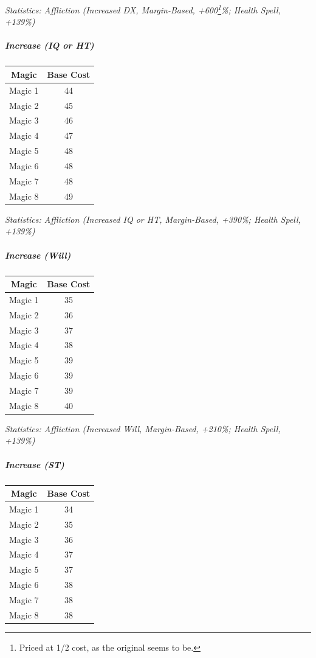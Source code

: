 \begin{multicols}{3}
	\textcolor{OliveGreen}{\textit{Statistics: Affliction (Increased DX, Margin-Based, +600\footnote{Priced at 1/2 cost, as the original seems to be.}\%; Health Spell, +139\%) }}
	
	\subparagraph{Increase (IQ or HT)}
	
	\begin{center}
		\begin{tabular}{|c|c|}
			\hline
			Magic & Base Cost \\
			\hline
			\hline
			Magic 1 & 44 \\
			Magic 2 & 45 \\
			Magic 3 & 46  \\
			Magic 4 & 47 \\
			Magic 5 & 48 \\
			Magic 6 & 48 \\
			Magic 7 & 48 \\
			Magic 8 & 49 \\
			\hline
		\end{tabular}
	\end{center}	
	
	\textcolor{OliveGreen}{\textit{Statistics: Affliction (Increased IQ or HT, Margin-Based, +390\%; Health Spell, +139\%) }}
	
	\subparagraph{Increase (Will)}
	
	\begin{center}
		\begin{tabular}{|c|c|}
			\hline
			Magic & Base Cost \\
			\hline
			\hline
			Magic 1 & 35 \\
			Magic 2 & 36 \\
			Magic 3 & 37 \\
			Magic 4 & 38 \\
			Magic 5 & 39 \\
			Magic 6 & 39 \\
			Magic 7 & 39 \\
			Magic 8 & 40 \\
			\hline
		\end{tabular}
	\end{center}	
	
	\textcolor{OliveGreen}{\textit{Statistics: Affliction (Increased Will, Margin-Based, +210\%; Health Spell, +139\%) }}
	
	\subparagraph{Increase (ST)}
	
	\begin{center}
		\begin{tabular}{|c|c|}
			\hline
			Magic & Base Cost \\
			\hline
			\hline
			Magic 1 & 34 \\
			Magic 2 & 35 \\
			Magic 3 & 36 \\
			Magic 4 & 37 \\
			Magic 5 & 37 \\
			Magic 6 & 38 \\
			Magic 7 & 38 \\
			Magic 8 & 38 \\
			\hline
		\end{tabular}
	\end{center}	
	

\end{multicols}
